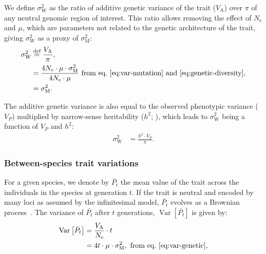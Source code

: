 \documentclass{article}
\newcommand{\defEqual}{\stackrel{\text{def}}{=}}
\newcommand{\Multiply}{\cdot}
\DeclareMathOperator{\Var}{\text{Var}}
\newcommand{\Ne}{N_{\text{e}}}
\newcommand{\Time}{t}
\newcommand{\Trait}{P}
\newcommand{\Heritability}{h^2}
\newcommand{\MeanTrait}{\bar{\Trait_{\Time}}}
\newcommand{\VarPhy}{\Var \left[\MeanTrait\right]}
\newcommand{\MutationRate}{\mu}
\newcommand{\VarPhenotype}{V_{\Trait}}
\newcommand{\VarGenetic}{V_{\mathrm{A}}}
\newcommand{\RateMut}{\sigma^2_{\mathrm{M}}}
\newcommand{\RateWhithin}{\sigma^2_{\mathrm{W}}}
\begin{document}
We define $\RateWhithin$ as the ratio of additive genetic variance of the trait ($\VarGenetic$) over $\pi$ of any neutral genomic region of interest.
This ratio allows removing the effect of $\Ne$ and $\MutationRate$, which are parameters not related to the genetic architecture of the trait, giving $\RateWhithin$ as a proxy of $\RateMut$:
\begin{align}
    \RateWhithin & \defEqual \frac{\VarGenetic }{\pi}, \\
    & = \frac{4 \Ne \Multiply \MutationRate \Multiply \RateMut}{4 \Ne \Multiply \MutationRate} \text{ from eq.~\ref{eq:var-mutation} and~\ref{eq:genetic-diversity}}, \\
    & = \RateMut. \label{eq:rate-pop}
\end{align}

The additive genetic variance is also equal to the observed phenotypic variance ($\VarPhenotype$) multiplied by narrow-sense heritability ($\Heritability$; \parencite{hill_data_2008}), which leads to $\RateWhithin$ being a function of $\VarPhenotype$ and $\Heritability$:
\begin{align}
    \RateWhithin & = \frac{\Heritability \Multiply \VarPhenotype }{\pi }. \label{eq:rate-pheno-pop}
\end{align}

\subsubsection*{Between-species trait variations}

For a given species, we denote by $\MeanTrait$ the mean value of the trait across the individuals in the species at generation $\Time$.
If the trait is neutral and encoded by many loci as assumed by the infinitesimal model, $\MeanTrait$ evolves as a Brownian process~\parencite{felsenstein_phylogenies_1985, hansen_translating_1996}.
The variance of $\MeanTrait$ after $\Time$ generations, $\VarPhy$ is given \parencite{hansen_translating_1996} by:
\begin{align}
    \VarPhy & = \frac{\VarGenetic}{\Ne} \Multiply \Time \\
    & = 4 \Time \Multiply \MutationRate \Multiply \RateMut \label{eq:covar},\text{ from eq.~\ref{eq:var-genetic}},
\end{align}
\end{document}
